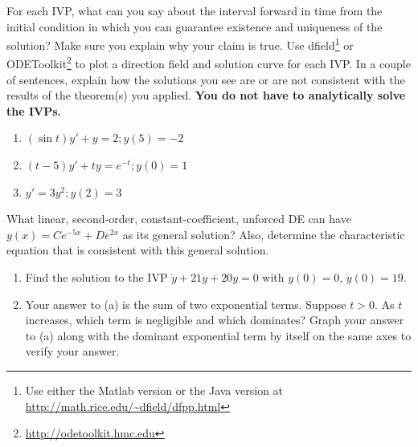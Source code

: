 \documentclass[12pt,letterpaper]{hmcpset}
\begin{document}
\begin{problem}[2]
For each IVP, what can you say about the interval forward in time from the initial condition in which you can guarantee existence and uniqueness of the solution?  Make sure you explain why your claim is true.   Use dfield\footnote{Use either the Matlab version or the Java version at \url{http://math.rice.edu/~dfield/dfpp.html}} or ODEToolkit\footnote{\url{http://odetoolkit.hmc.edu}} to plot a direction field and solution curve for each IVP.  In a couple of sentences, explain how the solutions you see are or are not consistent with the results of the theorem(s) you applied.  \textbf{You do not have to analytically solve the IVPs.}
\begin{enumerate}
\item $(\sin t) y' + y = 2; y(5) = -2$ 
\item $(t-5) y'+ t y = e^{-t}; y(0) = 1$
\item  $y'=3y^2; y(2)= 3$
\end{enumerate}
\end{problem}

\begin{solution}
  \vfill
\end{solution}
\newpage

\begin{problem}[3]
What linear, second-order, constant-coefficient, unforced DE can have $y(x)=Ce^{-5x}+De^{2x}$ as its general solution? Also, determine the characteristic equation that is consistent with this general solution.
\end{problem}

\begin{solution}
  \vfill
\end{solution}
\newpage

\begin{problem}[4]\begin{enumerate}
\item Find the solution to the IVP $\ddot{y}+21\dot{y}+20y=0$ with $y(0)=0$, $\dot{y}(0)=19$.
\item Your answer to (a) is the sum of two exponential terms. Suppose $t>0$. As $t$ increases, which term is negligible and which dominates? Graph your answer to (a) along with the dominant exponential term by itself on the same axes to verify your answer.
\end{enumerate}
\end{problem}

\begin{solution}
  \vfill
\end{solution}
\newpage
\end{document}
